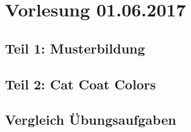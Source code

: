 \section{Vorlesung 01.06.2017}

\subsection{Teil 1: Musterbildung}

\subsection{Teil 2: Cat Coat Colors}

\subsection{Vergleich Übungsaufgaben}
